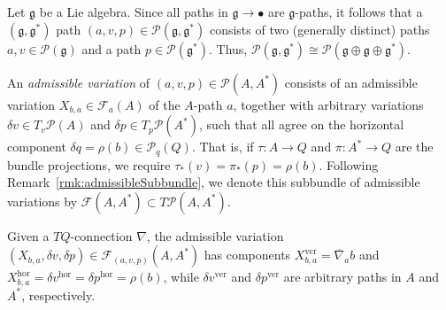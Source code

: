 \documentclass[10pt,a4paper]{amsart}
\numberwithin{equation}{section}
\begin{document}
\begin{Example} \label{ex:lieAlgebraPartI}
Let $ \mathfrak{g} $ be a Lie algebra. Since all paths in $\mathfrak{g} \rightarrow \bullet $ are $\mathfrak{g}$-paths, it follows that a~$ ( \mathfrak{g} , \mathfrak{g} ^\ast ) $ path $ ( a, v , p ) \in \mathcal{P} ( \mathfrak{g} , \mathfrak{g} ^\ast ) $ consists of two (generally distinct) paths $ a, v \in \mathcal{P} ( \mathfrak{g} ) $ and a path $ p \in \mathcal{P} ( \mathfrak{g} ^\ast ) $. Thus, $ \mathcal{P} ( \mathfrak{g} , \mathfrak{g} ^\ast ) \cong \mathcal{P} ( \mathfrak{g} \oplus \mathfrak{g} \oplus \mathfrak{g} ^\ast ) $.
\end{Example}

\begin{Definition}
An \emph{admissible variation} of $ ( a, v, p ) \in \mathcal{P} ( A, A ^\ast ) $ consists of an admissible variation $ X _{ b, a } \in \mathcal{F} _a (A) $ of the $A$-path $a$, together with arbitrary variations $ \delta v \in T _v \mathcal{P} ( A ) $ and $ \delta p \in T _p \mathcal{P} ( A ^\ast ) $, such that all agree on the horizontal component $ \delta q = \rho (b) \in \mathcal{P} _q (Q) $. That is, if $ \tau \colon A \rightarrow Q $ and $ \pi \colon A ^\ast \rightarrow Q $ are the bundle projections, we require $ \tau _\ast (v) = \pi _\ast (p) = \rho (b) $. Following Remark~\ref{rmk:admissibleSubbundle}, we denote this subbundle of admissible variations by $ \mathcal{F} (A, A ^\ast ) \subset T \mathcal{P} ( A, A ^\ast ) $.
\end{Definition}

\begin{Remark}
Given a $ T Q $-connection $ \nabla $, the admissible variation $ ( X _{ b, a } , \delta v, \delta p ) \in \mathcal{F} _{ ( a, v, p ) } ( A , A ^\ast ) $ has components $ X _{ b, a } ^\text{ver} = \overline{ \nabla } _a b $ and $ X _{ b, a } ^\text{hor} = \delta v ^\text{hor} = \delta p ^\text{hor} = \rho (b) $, while $ \delta v ^\text{ver} $ and $ \delta p ^\text{ver} $ are arbitrary paths in $A$ and $ A ^\ast $, respectively.
\end{Remark}
\end{document}
